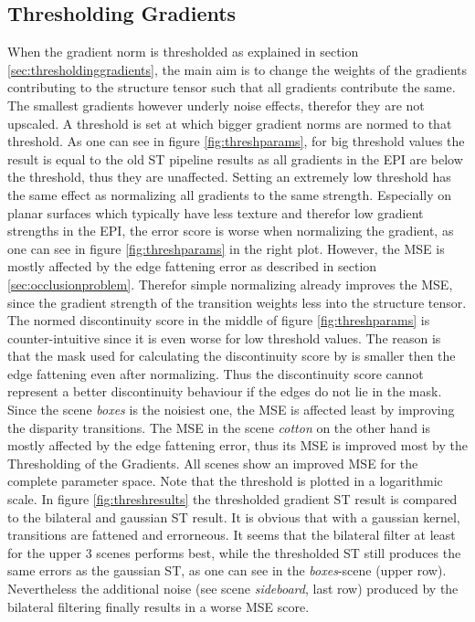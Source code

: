 \documentclass  [
  paper    = a4,
  BCOR     = 10mm,
  twoside,
  fontsize = 12pt,
  fleqn,
  toc      = bibnumbered,
  toc      = listofnumbered,
  numbers  = noendperiod,
  headings = normal,
  listof   = leveldown,
  version  = 3.03
]                                       {scrreprt}
\begin{document}
\subsection{Thresholding Gradients}
When the gradient norm is thresholded as explained in section \ref{sec:thresholdinggradients}, the main aim is to change the weights of the gradients contributing to the structure tensor such that all gradients contribute the same. The smallest gradients however underly noise effects, therefor they are not upscaled. A threshold is set at which bigger gradient norms are normed to that threshold. As one can see in figure \ref{fig:threshparams}, for big threshold values the result is equal to the old ST pipeline results as all gradients in the EPI are below the threshold, thus they are unaffected. Setting an extremely low threshold has the same effect as normalizing all gradients to the same strength. Especially on planar surfaces which typically have less texture and therefor low gradient strengths in the EPI, the error score is worse when normalizing the gradient, as one can see in figure \ref{fig:threshparams} in the right plot. However, the MSE is mostly affected by the edge fattening error as described in section \ref{sec:occlusionproblem}. Therefor simple normalizing already improves the MSE, since the gradient strength of the transition weights less into the structure tensor. The normed discontinuity score in the middle of figure \ref{fig:threshparams} is counter-intuitive since it is even worse for low threshold values. The reason is that the mask used for calculating the discontinuity score by \cite{honauer2016benchmark} is smaller then the edge fattening even after normalizing. Thus the discontinuity score cannot represent a better discontinuity behaviour if the edges do not lie in the mask. \\
Since the scene \textit{boxes} is the noisiest one, the MSE is affected least by improving the disparity transitions. The MSE in the scene \textit{cotton} on the other hand is mostly affected by the edge fattening error, thus its MSE is improved most by the Thresholding of the Gradients. All scenes show an improved MSE for the complete parameter space. Note that the threshold is plotted in a logarithmic scale. In figure \ref{fig:threshresults} the thresholded gradient ST result is compared to the bilateral and gaussian ST result. It is obvious that with a gaussian kernel, transitions are fattened and errorneous. It seems that the bilateral filter at least for the upper 3 scenes performs best, while the thresholded ST still produces the same errors as the gaussian ST, as one can see in the \textit{boxes}-scene (upper row). Nevertheless the additional noise (see scene \textit{sideboard}, last row) produced by the bilateral filtering finally results in a worse MSE score. 
\end{document}
